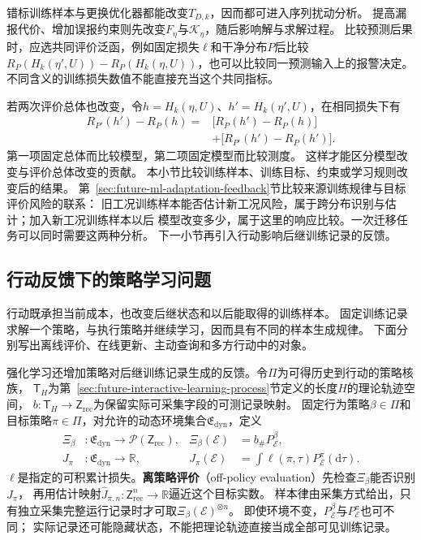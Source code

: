 错标训练样本与更换优化器都能改变$T_{D,k}$，因而都可进入序列扰动分析。
提高漏报代价、增加误报约束则先改变$F_\eta$与$\mathcal K_\eta$，随后影响解与求解过程。
比较预测后果时，应选共同评价泛函，例如固定损失$\ell$和干净分布$P$后比较
$R_P(H_k(\eta',U))-R_P(H_k(\eta,U))$，也可以比较同一预测输入上的报警决定。
不同含义的训练损失数值不能直接充当这个共同指标。

若两次评价总体也改变，令$h=H_k(\eta,U)$、$h'=H_k(\eta',U)$，在相同损失下有
\[
  \begin{aligned}
    R_{P'}(h')-R_P(h)
    ={}&\bigl[R_P(h')-R_P(h)\bigr]\\
       &+\bigl[R_{P'}(h')-R_P(h')\bigr].
  \end{aligned}
\]
第一项固定总体而比较模型，第二项固定模型而比较测度。
这样才能区分模型改变与评价总体改变的贡献。
本小节比较训练样本、训练目标、约束或学习规则改变后的结果。
第~\ref{sec:future-ml-adaptation-feedback}节比较来源训练规律与目标评价风险的联系：
旧工况训练样本能否估计新工况风险，属于跨分布识别与估计；加入新工况训练样本以后
模型改变多少，属于这里的响应比较。一次迁移任务可以同时需要这两种分析。
下一小节再引入行动影响后继训练记录的反馈。

\subsection{行动反馈下的策略学习问题}
\label{sec:future-action-feedback-conditions}

行动既承担当前成本，也改变后继状态和以后能取得的训练样本。
固定训练记录求解一个策略，与执行策略并继续学习，因而具有不同的样本生成规律。
下面分别写出离线评价、在线更新、主动查询和多方行动中的对象。

强化学习还增加策略对后继训练记录生成的反馈。令$\Pi$为可得历史到行动的策略核族，
$\mathsf T_H$为第~\ref{sec:future-interactive-learning-process}节定义的长度$H$的理论轨迹空间，
$b:\mathsf T_H\to\mathsf Z_{\mathrm{rec}}$为保留实际可采集字段的可测记录映射。
固定行为策略$\beta\in\Pi$和目标策略$\pi\in\Pi$，对允许的动态环境集合$\mathfrak E_{\mathrm{dyn}}$，定义
\begin{equation}
  \begin{aligned}
    \Xi_\beta&:\mathfrak E_{\mathrm{dyn}}\to\mathcal P(\mathsf Z_{\mathrm{rec}}),
      &\Xi_\beta(\mathcal E)&=b_{\#}P_{\mathcal E}^{\beta},\\
    J_\pi&:\mathfrak E_{\mathrm{dyn}}\to\mathbb R,
      &J_\pi(\mathcal E)&=\int\ell(\pi,\tau)P_{\mathcal E}^{\pi}(\mathrm d\tau).
  \end{aligned}
  \label{eq:future-task-off-policy-maps}
\end{equation}
$\ell$是指定的可积累计损失。\textbf{离策略评价}（off-policy evaluation）先检查$\Xi_\beta$能否识别$J_\pi$，
再用估计映射$\widehat J_{\pi,n}:\mathsf Z_{\mathrm{rec}}^n\to\mathbb R$逼近这个目标实数。
样本律由采集方式给出，只有独立采集完整运行记录时才可取$\Xi_\beta(\mathcal E)^{\otimes n}$。
即使环境不变，$P_{\mathcal E}^{\beta}$与$P_{\mathcal E}^{\pi}$也可不同；
实际记录还可能隐藏状态，不能把理论轨迹直接当成全部可见训练记录。

